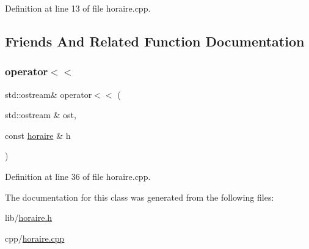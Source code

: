 Definition at line 13 of file horaire.\+cpp.



\subsection{Friends And Related Function Documentation}
\hypertarget{classhoraire_a152efd207823bf7d5cfb1dac6312c6b9}{}\label{classhoraire_a152efd207823bf7d5cfb1dac6312c6b9} 
\subsubsection{\texorpdfstring{operator$<$$<$}{operator<<}}
{\footnotesize\ttfamily std\+::ostream\& operator$<$$<$ (\begin{DoxyParamCaption}\item[{std\+::ostream \&}]{ost,  }\item[{const \hyperlink{classhoraire}{horaire} \&}]{h }\end{DoxyParamCaption})\hspace{0.3cm}{\ttfamily [friend]}}



Definition at line 36 of file horaire.\+cpp.



The documentation for this class was generated from the following files\+:\begin{DoxyCompactItemize}
\item 
lib/\hyperlink{horaire_8h}{horaire.\+h}\item 
cpp/\hyperlink{horaire_8cpp}{horaire.\+cpp}\end{DoxyCompactItemize}
